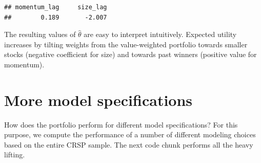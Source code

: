 \documentclass[
]{book}
\newenvironment{Shaded}{\begin{snugshade}}{\end{snugshade}}
\newcommand{\AttributeTok}[1]{\textcolor[rgb]{0.61,0.61,0.61}{#1}}
\newcommand{\ConstantTok}[1]{\textcolor[rgb]{0,0,0}{#1}}
\newcommand{\DecValTok}[1]{\textcolor[rgb]{0.06,0.06,0.06}{#1}}
\newcommand{\ErrorTok}[1]{\textcolor[rgb]{0.14,0.14,0.14}{\textbf{#1}}}
\newcommand{\FunctionTok}[1]{\textcolor[rgb]{0,0,0}{#1}}
\newcommand{\NormalTok}[1]{#1}
\newcommand{\OtherTok}[1]{\textcolor[rgb]{0.37,0.37,0.37}{#1}}
\newcommand{\SpecialCharTok}[1]{\textcolor[rgb]{0,0,0}{#1}}
\newcommand{\StringTok}[1]{\textcolor[rgb]{0.5,0.5,0.5}{#1}}
\begin{document}
\begin{verbatim}
## momentum_lag     size_lag 
##        0.189       -2.007
\end{verbatim}

The resulting values of \(\hat\theta\) are easy to interpret intuitively. Expected utility increases by tilting weights from the value-weighted portfolio towards smaller stocks (negative coefficient for size) and towards past winners (positive value for momentum).

\hypertarget{more-model-specifications}{%
\section{More model specifications}\label{more-model-specifications}}

How does the portfolio perform for different model specifications? For this purpose, we compute the performance of a number of different modeling choices based on the entire CRSP sample. The next code chunk performs all the heavy lifting.

\begin{Shaded}
\end{Shaded}
\end{document}
